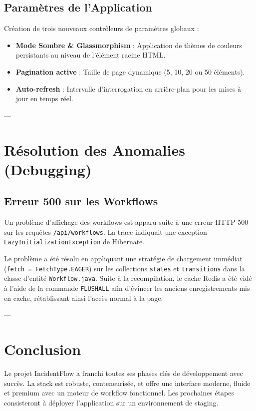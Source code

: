 \documentclass[12pt]{article}
\begin{document}
\subsection{Paramètres de l'Application}
Création de trois nouveaux contrôleurs de paramètres globaux :
\begin{itemize}
    \item \textbf{Mode Sombre \& Glassmorphism} : Application de thèmes de couleurs persistants au niveau de l'élément racine HTML.
    \item \textbf{Pagination active} : Taille de page dynamique (5, 10, 20 ou 50 éléments).
    \item \textbf{Auto-refresh} : Intervalle d'interrogation en arrière-plan pour les mises à jour en temps réel.
\end{itemize}

---

\section{Résolution des Anomalies (Debugging)}
\subsection{Erreur 500 sur les Workflows}
Un problème d'affichage des workflows est apparu suite à une erreur HTTP 500 sur les requêtes \texttt{/api/workflows}. La trace indiquait une exception \texttt{LazyInitializationException} de Hibernate. 

Le problème a été résolu en appliquant une stratégie de chargement immédiat (\texttt{fetch = FetchType.EAGER}) sur les collections \texttt{states} et \texttt{transitions} dans la classe d'entité \texttt{Workflow.java}. Suite à la recompilation, le cache Redis a été vidé à l'aide de la commande \texttt{FLUSHALL} afin d'évincer les anciens enregistrements mis en cache, rétablissant ainsi l'accès normal à la page.

---

\section{Conclusion}
Le projet IncidentFlow a franchi toutes ses phases clés de développement avec succès. La stack est robuste, conteneurisée, et offre une interface moderne, fluide et premium avec un moteur de workflow fonctionnel. Les prochaines étapes consisteront à déployer l'application sur un environnement de staging.
\end{document}
